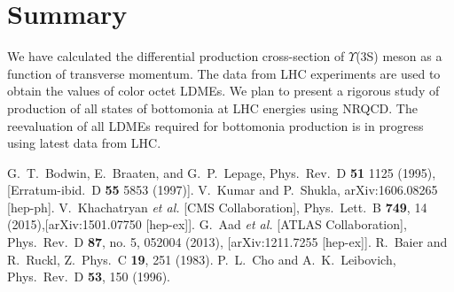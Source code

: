 \documentclass[twocolumn,amsmath,amssymb]{snp}
\begin{document}
\section*{Summary}
We have calculated the differential production cross-section of $\Upsilon$(3S) meson
as a function of transverse momentum. The data from LHC experiments are used to 
obtain the values of color octet LDMEs. We plan to present a rigorous study of 
production of all states of bottomonia at LHC energies using NRQCD.
The reevaluation of all LDMEs required for bottomonia production is in progress using 
latest data from LHC.         
\begin{thebibliography}{50}
G.~T.~Bodwin, E.~Braaten, and G.~P.~Lepage,
Phys.\ Rev.\ D {\bf 51} 1125 (1995), 
[Erratum-ibid.\ D {\bf 55} 5853 (1997)].
  V.~Kumar and P.~Shukla,
  arXiv:1606.08265 [hep-ph].
  V.~Khachatryan {\it et al.} [CMS Collaboration],
  Phys.\ Lett.\ B {\bf 749}, 14 (2015),[arXiv:1501.07750 [hep-ex]].
  G.~Aad {\it et al.} [ATLAS Collaboration],
  Phys.\ Rev.\ D {\bf 87}, no. 5, 052004 (2013),
  [arXiv:1211.7255 [hep-ex]].
  R.~Baier and R.~Ruckl,
  Z.\ Phys.\ C {\bf 19}, 251 (1983).
  P.~L.~Cho and A.~K.~Leibovich,
  Phys.\ Rev.\ D {\bf 53}, 150 (1996).

\end{thebibliography}
\end{document}
